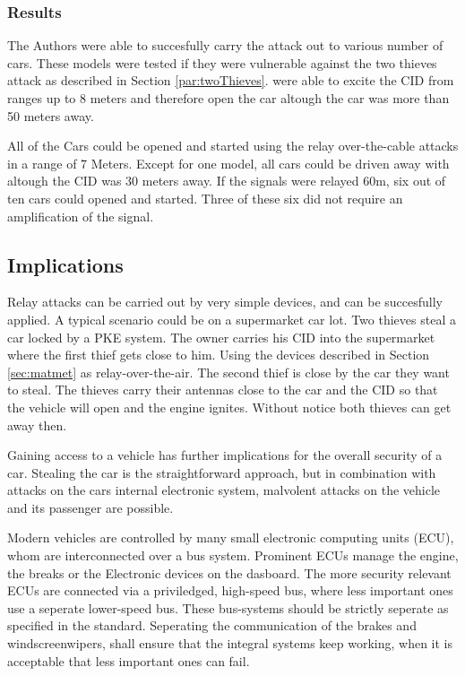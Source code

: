 \subsubsection*{Results}
	The Authors were able to succesfully carry the attack out to various number of cars.
	These models were tested if they were vulnerable against the two thieves attack as described in 
	Section \ref{par:twoThieves}.
	\citeauthor{relayAttacksFranc} were able to excite the CID from ranges up to 8 meters
	and therefore open the car altough the car was more than 50 meters away.

	All of the Cars could be opened and started using the relay over-the-cable attacks in a range of 7 Meters.
	Except for one model,
	all cars could be driven away with altough the CID was 30 meters away.
	If the signals were relayed 60m,
	six out of ten cars could opened and started.
	Three of these six did not require an amplification of the signal.


\subsection*{Implications}
	\label{sec:attackImplications}
	Relay attacks can be carried out by very simple devices,
	and can be succesfully applied.
	A typical scenario could be on a supermarket car lot.
	Two thieves steal a car locked by a PKE system.
	The owner carries his CID into the supermarket where the first thief gets close to him.
	Using the devices described in Section \ref{sec:matmet} as relay-over-the-air.
	The second thief is close by the car they want to steal.
	The thieves carry their antennas close to the car and the CID so that the vehicle will open
	and the engine ignites.
	Without notice both thieves can get away then.

	Gaining access to a vehicle has further implications for the overall security of a car.
	Stealing the car is the straightforward approach,
	but in combination with attacks on the cars internal electronic system,
	malvolent attacks on the vehicle and its passenger are possible.

	Modern vehicles are controlled by many small electronic computing units (ECU),
	whom are interconnected over a bus system.
	Prominent ECUs manage the engine, the breaks or the Electronic devices on the dasboard.
	The more security relevant ECUs are connected via a priviledged,
	high-speed bus,
	where less important ones use a seperate lower-speed bus.
	These bus-systems should be strictly seperate as specified in the standard. %
	Seperating the communication of the brakes and windscreenwipers,
	shall ensure that the integral systems keep working,
	when it is acceptable that less important ones can fail.


